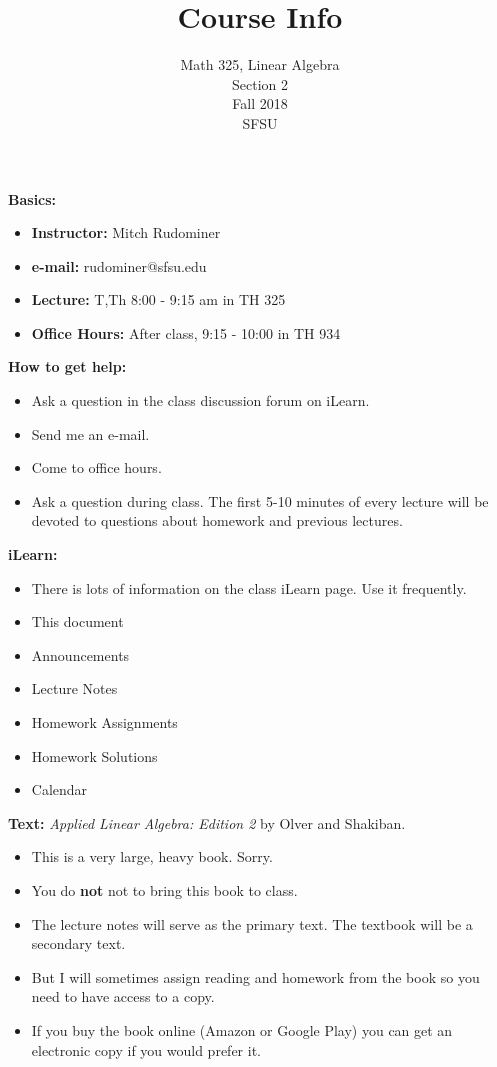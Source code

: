 \documentclass[oneside,12pt]{amsart}
\begin{document}
\title{Course Info}
\author{Math 325, Linear Algebra \\ Section 2 \\ Fall 2018 \\ SFSU }
\date{}

\maketitle

\textbf{Basics:}
\begin{itemize}
\item \textbf{Instructor:} Mitch Rudominer
\item \textbf{e-mail:} rudominer@sfsu.edu
\item \textbf{Lecture:}  T,Th 8:00 - 9:15 am in TH 325
\item \textbf{Office Hours:} After class, 9:15 - 10:00 in TH 934
\end{itemize}

\bigskip

\textbf{How to get help:}
\begin{itemize}
\item Ask a question in the class discussion forum on iLearn.
\item Send me an e-mail.
\item Come to office hours.
\item Ask a question during class. The first 5-10 minutes of every lecture will be devoted to questions about homework and previous lectures.
\end{itemize}

\bigskip

\textbf{iLearn:}
\begin{itemize}
\item There is lots of information on the class iLearn page. Use it frequently.
\item This document
\item Announcements
\item Lecture Notes
\item Homework Assignments
\item Homework Solutions
\item Calendar
\end{itemize}

\bigskip

\textbf{Text:} \emph{Applied Linear Algebra: Edition 2} by Olver and Shakiban.
\begin{itemize}
\item This is a very large, heavy book. Sorry.
\item You do \textbf{not} not to bring this book to class.
\item The lecture notes will serve as the primary text. The textbook will be a secondary text.
\item But I will sometimes assign reading and homework from the book so you need to have access to a copy.
\item If you buy the book online (Amazon or Google Play) you can get an electronic copy if you would prefer it.
\end{itemize}
\end{document}

